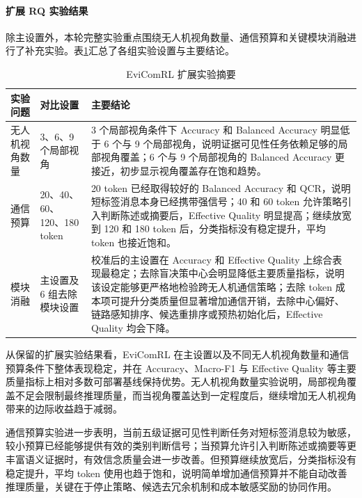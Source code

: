 \paragraph{扩展 RQ 实验结果}
除主设置外，本轮完整实验重点围绕无人机视角数量、通信预算和关键模块消融进行了补充实验。表\ref{tab:rq_experiment_summary}汇总了各组实验设置与主要结论。

\begin{table}[!htbp]
\centering
\caption{EviComRL 扩展实验摘要}
\label{tab:rq_experiment_summary}
\begingroup
\footnotesize
\setlength{\tabcolsep}{3pt}
\renewcommand{\arraystretch}{0.92}
\begin{tabularx}{\textwidth}{p{1.8cm}p{3.1cm}X}
\toprule
实验问题 & 对比设置 & 主要结论 \\
\midrule
无人机视角数量 & 3、6、9 个局部视角 & 3 个局部视角条件下 Accuracy 和 Balanced Accuracy 明显低于 6 个与 9 个局部视角，说明证据可见性任务依赖足够的局部视角覆盖；6 个与 9 个局部视角的 Balanced Accuracy 更接近，初步显示视角覆盖存在饱和趋势。 \\
通信预算 & 20、40、60、120、180 token & 20 token 已经取得较好的 Balanced Accuracy 和 QCR，说明短标签消息本身已经携带强信号；40 和 60 token 允许策略引入判断陈述或摘要后，Effective Quality 明显提高；继续放宽到 120 和 180 token 后，分类指标没有稳定提升，平均 token 也接近饱和。 \\
模块消融 & 主设置及 6 组去除模块设置 & 校准后的主设置在 Accuracy 和 Effective Quality 上综合表现最稳定；去除盲决策中心会明显降低主要质量指标，说明该设定能够更严格地检验跨无人机通信策略；去除 token 成本项可提升分类质量但显著增加通信开销，去除中心偏好、链路感知排序、候选重排序或预热初始化后，Effective Quality 均会下降。 \\
\bottomrule
\end{tabularx}
\endgroup
\end{table}

从保留的扩展实验结果看，EviComRL 在主设置以及不同无人机视角数量和通信预算条件下整体表现稳定，并在 Accuracy、Macro-F1 与 Effective Quality 等主要质量指标上相对多数可部署基线保持优势。无人机视角数量实验说明，局部视角覆盖不足会限制最终推理质量，而当视角覆盖达到一定程度后，继续增加无人机视角带来的边际收益趋于减弱。

通信预算实验进一步表明，当前五级证据可见性判断任务对短标签消息较为敏感，较小预算已经能够提供有效的类别判断信号；当预算允许引入判断陈述或摘要等更丰富语义证据时，有效信念质量会进一步改善。但预算继续放宽后，分类指标没有稳定提升，平均 token 使用也趋于饱和，说明简单增加通信预算并不能自动改善推理质量，关键在于停止策略、候选去冗余机制和成本敏感奖励的协同作用。

